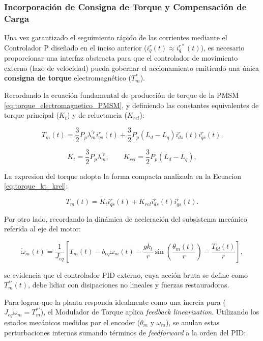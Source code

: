 \documentclass[10pt,a4paper]{article}
\begin{document}
\subsubsection{Incorporación de Consigna de Torque y Compensación de Carga}

Una vez garantizado el seguimiento rápido de las corrientes mediante el Controlador P diseñado en el inciso anterior ($i_q^r(t) \approx i_q^{r*}(t)$), 
es necesario proporcionar una interfaz abstracta para que el controlador de movimiento externo (lazo de velocidad) pueda gobernar el accionamiento emitiendo una única \textbf{consigna de torque} electromagnético ($T_m^*$).

Recordando la ecuación fundamental de producción de torque de la PMSM \eqref{eq:torque_electromagnetico_PMSM}, y definiendo las constantes equivalentes de torque principal ($K_t$) y de reluctancia ($K_{rel}$):

\begin{equation*}
	T_m(t) = \frac{3}{2}P_p \lambda_m^{\prime r} i_{qs}^{r}(t) + \frac{3}{2}P_p \left(L_d - L_q\right) i_{ds}^{r}(t)i_{qs}^{r}(t).
\end{equation*}

\begin{equation*}
    K_t = \frac{3}{2}P_p \lambda_m^{\prime r}, \qquad K_{rel} = \frac{3}{2}P_p \left(L_d - L_q\right),
\end{equation*}

La expresion del torque adopta la forma compacta analizada en la Ecuacion \eqref{eq:torque_kt_krel}:

\begin{equation*}
	T_m(t) = K_t i_{qs}^{r}(t) + K_{rel} i_{ds}^{r}(t)i_{qs}^{r}(t).
\end{equation*}

Por otro lado, recordando la dinámica de aceleración del subsistema mecánico referida al eje del motor:

\begin{equation*}
    \dot{\omega}_m(t) = \frac{1}{J_{eq}} \left[ T_m(t) - b_{eq}\omega_m(t) - \frac{g k_l}{r} \sin\left(\frac{\theta_m(t)}{r}\right) - \frac{T_{ld}(t)}{r} \right],
\end{equation*}

se evidencia que el controlador PID externo, cuya acción bruta se define como $T_{m}^{*\prime}(t)$, debe lidiar con disipaciones no lineales y fuerzas restauradoras.

Para lograr que la planta responda idealmente como una inercia pura ($J_{eq}\dot{\omega}_m = T_{m}^{*\prime}$), el Modulador de Torque aplica \textit{feedback linearization}. Utilizando los estados mecánicos medidos por el encoder ($\theta_m$ y $\omega_m$), se anulan estas perturbaciones internas sumando términos de \textit{feedforward} a la orden del PID:
\end{document}
